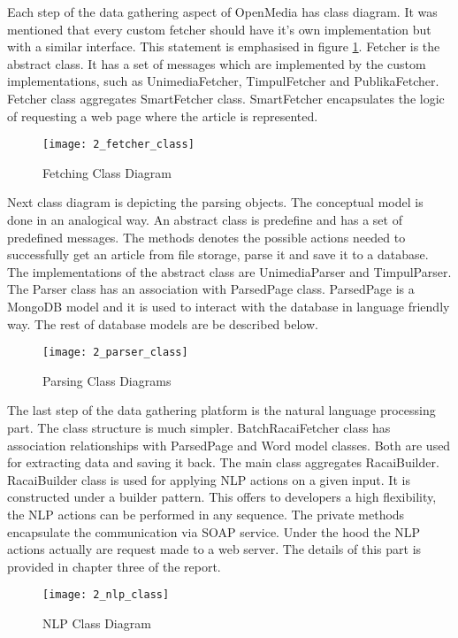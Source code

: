 Each step of the data gathering aspect of OpenMedia has class diagram. It was mentioned that every custom fetcher should have it's own implementation but with a similar interface. This statement is emphasised in figure \ref{fetcher_class}. Fetcher is the abstract class. It has a set of messages which are implemented by the custom implementations, such as UnimediaFetcher, TimpulFetcher and PublikaFetcher. Fetcher class aggregates SmartFetcher class. SmartFetcher encapsulates the logic of requesting a web page where the article is represented.

\begin{figure}[!ht]
\centering
\texttt{[image: 2\_fetcher\_class]}
\caption{Fetching Class Diagram}\label{fetcher_class}
\end{figure}

Next class diagram is depicting the parsing objects. The conceptual model is done in an analogical way. An abstract class is predefine and has a set of predefined messages. The methods denotes the possible actions needed to successfully get an article from file storage, parse it and save it to a database. The implementations of the abstract class are UnimediaParser and TimpulParser. The Parser class has an association with ParsedPage class. ParsedPage is a MongoDB model and it is used to interact with the database in language friendly way. The rest of database models are be described below.

\begin{figure}[!ht]
\centering
\texttt{[image: 2\_parser\_class]}
\caption{Parsing Class Diagrams}\label{parser_class}
\end{figure}

The last step of the data gathering platform is the natural language processing part. The class structure is much simpler. BatchRacaiFetcher class has association relationships with ParsedPage and Word model classes. Both are used for extracting data and saving it back. The main class aggregates RacaiBuilder. RacaiBuilder class is used for applying NLP actions on a given input. It is constructed under a builder pattern. This offers to developers a high flexibility, the NLP actions can be performed in any sequence. The private methods encapsulate the communication via SOAP service. Under the hood the NLP actions actually are request made to a web server. The details of this part is provided in chapter three of the report.

\begin{figure}[!ht]
\centering
\texttt{[image: 2\_nlp\_class]}
\caption{NLP Class Diagram}\label{nlp_class}
\end{figure}

